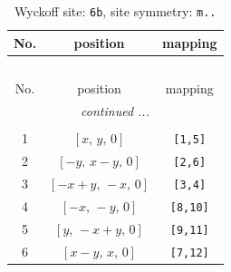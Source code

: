 \documentclass[fleqn,8pt]{jsarticle}
\begin{document}
\begin{longtable}{ccc}
\caption{Wyckoff site: {\tt 6b}, site symmetry: {\tt m..}}
 \\
 \hline \hline
No. & position & mapping \\ \hline \endfirsthead

\multicolumn{2}{l}{\tablename\ \thetable{}} \\
 \hline \hline
No. & position & mapping \\ \hline \endhead

 \hline \hline
\multicolumn{2}{r}{\footnotesize\it continued ...} \\ \endfoot

 \hline \hline
\multicolumn{2}{r}{} \\ \endlastfoot

1 & $\left[ x,\, y,\, 0 \right]$ & {\tt [1,5]} \\ \hline
2 & $\left[ - y,\, x - y,\, 0 \right]$ & {\tt [2,6]} \\ \hline
3 & $\left[ - x + y,\, - x,\, 0 \right]$ & {\tt [3,4]} \\ \hline
4 & $\left[ - x,\, - y,\, 0 \right]$ & {\tt [8,10]} \\ \hline
5 & $\left[ y,\, - x + y,\, 0 \right]$ & {\tt [9,11]} \\ \hline
6 & $\left[ x - y,\, x,\, 0 \right]$ & {\tt [7,12]} \\
\end{longtable}
\renewcommand{\arraystretch}{1.2}
\end{document}
